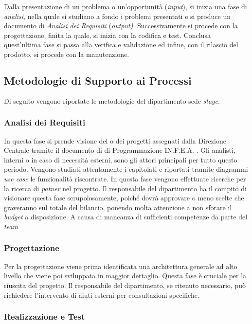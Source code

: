 Dalla presentazione di un problema o un'opportunità (\textit{input}), si inizia una fase di \textit{analisi}, nella quale si studiano a fondo i problemi presentati e si produce un documento di \textit{Analisi dei Requisiti} (\textit{output)}. Successivamente si procede con la progettazione, finita la quale, si inizia con la codifica e test. Conclusa quest'ultima fase si passa alla verifica  e validazione ed infine, con il rilascio del prodotto, si procede con la manutenzione.

 
\subsection{Metodologie di Supporto ai Processi}

Di seguito vengono riportate le metodologie del dipartimento sede \textit{stage}.

\subsubsection{Analisi dei Requisiti}

In questa fase si prende visione del o dei progetti assegnati dalla Direzione Centrale tramite il documento di di Programmazione IN.F.E.A. . Gli analisti, interni o in caso di necessità esterni, sono gli attori principali per tutto questo periodo. Vengono studiati attentamente i capitolati e riportati tramite diagrammi \textit{use case} le funzionalità riscontrate. In questa fase vengono effettuate ricerche per la ricerca di \textit{patner} nel progetto. Il responsabile del dipartimento ha il compito di visionare questa fase scrupolosamente, poiché dovrà approvare o meno scelte che graveranno sul totale del bilancio, ponendo molta attenzione a non sforare il \textit{budget} a disposizione. A causa di mancanza di sufficienti competenze da parte del \textit{team} 

\subsubsection{Progettazione}

Per la progettazione viene prima identificata una architettura generale ad alto livello che viene poi sviluppata in maggior dettaglio. Questa fase è cruciale per la riuscita del progetto. Il responsabile del dipartimento, se ritenuto necessario, può richiedere l'intervento di aiuti esterni per consultazioni specifiche.

\subsubsection{Realizzazione e Test}

